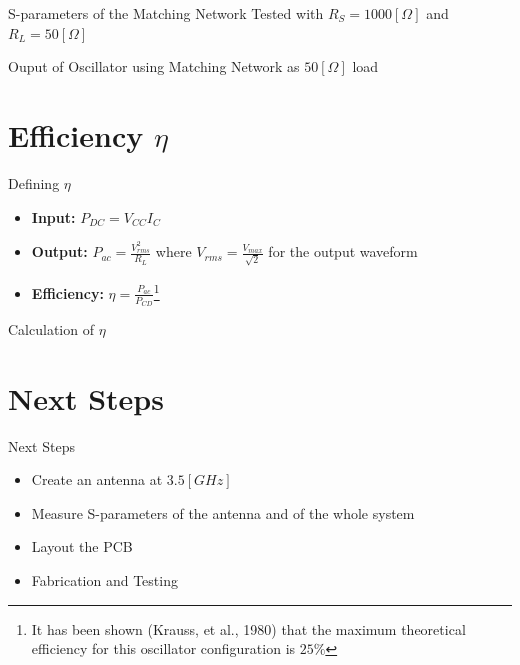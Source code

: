 \documentclass{beamer}
\begin{document}
\begin{frame}{S-parameters of the Matching Network}
Tested with \(R_S = 1000 [\Omega]\) and \(R_L = 50[\Omega]\)

\end{frame}

\begin{frame}{Ouput of Oscillator using Matching Network as \(50[\Omega]\) load}

\end{frame}


\section{Efficiency \(\eta\)}

\begin{frame}{Defining \(\eta\)}
\begin{itemize}
  \item <1-> \textbf{Input:} \(P_{DC} = V_{CC}I_C\)
  \item <2-> \textbf{Output:} \(P_{ac} = \frac{V_{rms}^2}{R_L}\) where \(V_{rms}=\frac{V_{max}}{\sqrt{2}}\) for the output waveform
  \item <3-> \textbf{Efficiency:} \(\eta=\frac{P_{ac}}{P_{CD}}\)\footnote{It has been shown (Krauss, et al., 1980) that the maximum theoretical efficiency for this oscillator configuration is \(25\%\)}
\end{itemize}
\end{frame}

\begin{frame}{Calculation of \(\eta\)}
  
\end{frame}


\section{Next Steps}

\begin{frame}{Next Steps}
\begin{itemize}
  \item <1-> Create an antenna at \(3.5[GHz]\)
  \item <2-> Measure S-parameters of the antenna and of the whole system
  \item <3-> Layout the PCB
  \item <4-> Fabrication and Testing
\end{itemize}
\end{frame}
\end{document}
